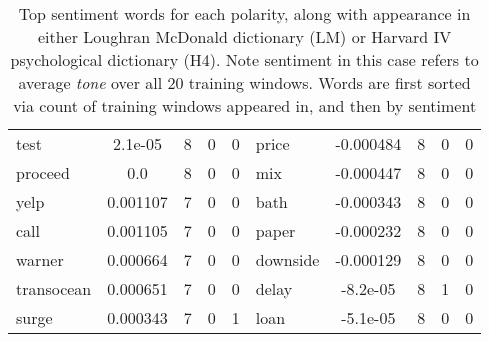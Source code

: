 \documentclass[ oneside,tikz,%
                    author={Joshua Felmeden},
                    degree={MEng},
                     title={Semantic Analysis of Financial Headlines Based on Realised Stock Returns},
                  subtitle={Research}]{dissertation}
\begin{document}
\begin{table}
\begin{tabular}{lcccclcccc}
test & 2.1e-05 & 8 & 0 & 0 & price & -0.000484 & 8 & 0 & 0 \\
proceed & 0.0 & 8 & 0 & 0 & mix & -0.000447 & 8 & 0 & 0 \\
yelp & 0.001107 & 7 & 0 & 0 & bath & -0.000343 & 8 & 0 & 0 \\
call & 0.001105 & 7 & 0 & 0 & paper & -0.000232 & 8 & 0 & 0 \\
warner & 0.000664 & 7 & 0 & 0 & downside & -0.000129 & 8 & 0 & 0 \\
transocean & 0.000651 & 7 & 0 & 0 & delay & -8.2e-05 & 8 & 1 & 0 \\
surge & 0.000343 & 7 & 0 & 1 & loan & -5.1e-05 & 8 & 0 & 0 \\
\bottomrule
\end{tabular}
\caption[Sentiment word list for unigrams]{Top sentiment words for each polarity, along with appearance in either Loughran McDonald dictionary (LM) or Harvard IV psychological dictionary (H4). Note sentiment in this case refers to average \textit{tone} over all 20 training windows. Words are first sorted via count of training windows appeared in, and then by sentiment}
\end{table}
\end{document}

